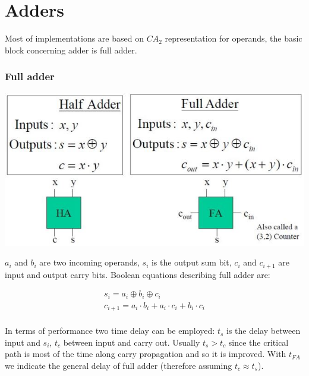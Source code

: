 \chapter{Adders}
Most of implementations are based on $CA_2$ representation for operands,
the basic block concerning adder is full adder.


\subsection{Full adder}
\begin{center}
  \includegraphics[width=0.7\linewidth]{img/img2/1}
\end{center}

$a_i$ and $b_i$ are two incoming operands, $s_i$ is the output sum bit,
$c_i$ and $c_{i+1}$ are input and output carry bits.
Boolean equations describing full adder are:

\begin{eqnarray*}
s_i=a_i \oplus b_i \oplus c_i\\
c_{i+1}=a_i \cdot b_i+a_i \cdot  c_i+b_i \cdot c_i\\
\end{eqnarray*}

In terms of performance two time delay can be employed:
$t_s$ is the delay between input and $s_i$, $t_c$ between input and carry out.
Usually $t_s > t_c$ since the critical path is most of the time along carry
propagation and so it is improved. With $t_{FA}$ we indicate the general delay
of full adder (therefore assuming $t_c \approx t_s$).


